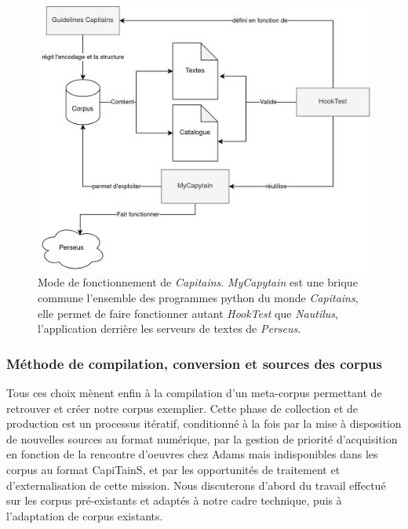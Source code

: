 \begin{figure}
    \centering
    \includegraphics[width=\textwidth]{figures/chap1/part2//capitains.png}
    \caption{Mode de fonctionnement de \textit{Capitains}. \textit{MyCapytain} est une brique commune  l'ensemble des programmes python du monde \textit{Capitains}, elle permet de faire fonctionner autant \textit{HookTest} que \textit{Nautilus}, l'application derrière les serveurs de textes de \textit{Perseus}.}
    \label{fig:chap1:Capitains}
\end{figure}




\subsubsection{Méthode de compilation, conversion et sources des corpus}

Tous ces choix mènent enfin à la compilation d'un meta-corpus permettant de retrouver et créer notre corpus exemplier. Cette phase de collection et de production est un processus itératif, conditionné à la fois par la mise à disposition de nouvelles sources au format numérique, par la gestion de priorité d'acquisition en fonction de la rencontre d'oeuvres chez Adams mais indisponibles dans les corpus au format CapiTainS, et par les opportunités de traitement et d'externalisation de cette mission. Nous discuterons d'abord du travail effectué sur les corpus pré-existants et adaptés à notre cadre technique, puis à l'adaptation de corpus existants.

